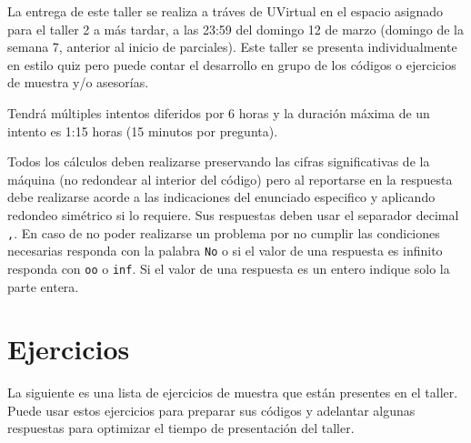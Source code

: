 \documentclass[12pt]{article}
\begin{document}
La entrega de este taller se realiza a tráves de UVirtual en el espacio asignado para el taller 2 a más tardar, a las 23:59 del domingo 12 de marzo (domingo de la semana 7, anterior al inicio de parciales). Este taller se presenta individualmente en estilo quiz pero puede contar el desarrollo en grupo de los códigos o ejercicios de muestra y/o asesorías.

  Tendrá múltiples intentos diferidos por 6 horas y la duración máxima de un intento es 1:15 horas (15 minutos por pregunta).

  Todos los cálculos deben realizarse preservando las cifras significativas de la máquina (no redondear al interior del código) pero al reportarse en la respuesta debe realizarse acorde a las indicaciones del enunciado especifico y aplicando redondeo simétrico si lo requiere. Sus respuestas deben usar el separador decimal \verb-,-. En caso de no poder realizarse un problema por no cumplir las condiciones necesarias responda con la palabra \verb-No- o si el valor de una respuesta es infinito responda con \verb-oo- o \verb-inf-. Si el valor de una respuesta es un entero indique solo la parte entera.

  \section{Ejercicios}

  La siguiente es una lista de ejercicios de muestra que están presentes en el taller. Puede usar estos ejercicios para preparar sus códigos y adelantar algunas respuestas para optimizar el tiempo de presentación del taller.
\end{document}
